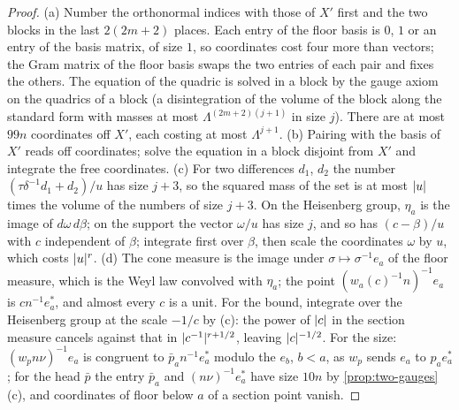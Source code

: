 \begin{proof}
(a) Number the orthonormal indices with those of $X'$ first and the two blocks in the last $2(2m+2)$ places. Each entry of the floor basis is $0$, $1$ or an entry of the basis matrix, of size $1$, so coordinates cost four
more than vectors; the Gram matrix of the floor basis swaps the two entries of each pair and fixes the others. The equation of the quadric is solved in a block by the gauge axiom on the quadrics of a block (a disintegration
of the volume of the block along the standard form with masses at most $\Lambda^{(2m+2)(j+1)}$ in size $j$). There are at most $99n$ coordinates off $X'$, each costing at most $\Lambda^{j+1}$. (b) Pairing with the basis of $X'$ reads
off coordinates; solve the equation in a block disjoint from $X'$ and integrate the free coordinates. (c) For two differences $d_1$, $d_2$ the number $(\tau\delta^{-1}d_1+d_2)/u$ has size $j+3$, so the squared mass of the set is at most $\lvert u\rvert$ times
the volume of the numbers of size $j+3$. On the Heisenberg group, $\eta_a$ is the image of $d\omega\,d\beta$; on the support the vector $\omega/u$ has size $j$, and so has $(c-\beta)/u$ with $c$ independent of $\beta$; integrate first over
$\beta$, then scale the coordinates $\omega$ by $u$, which costs $\lvert u\rvert^r$. (d) The cone measure is the image under $\sigma\mapsto\sigma^{-1}e_a$ of the floor measure, which is the Weyl law convolved with $\eta_a$; the point
$(w_a(c)^{-1}n)^{-1}e_a$ is $cn^{-1}e^*_a$, and almost every $c$ is a unit. For the bound, integrate over the Heisenberg group at the scale $-1/c$ by (c): the power of $\lvert c\rvert$ in the section measure cancels against that in
$\lvert c^{-1}\rvert^{r+1/2}$, leaving $\lvert c\rvert^{-1/2}$. For the size: $(w_pn\nu)^{-1}e_a$ is congruent to $\bar p_an^{-1}e^*_a$ modulo the $e_b$, $b<a$, as $w_p$ sends $e_a$ to $p_ae^*_a$; for the head $\bar p$ the entry $\bar p_a$ and $(n\nu)^{-1}e^*_a$ have size
$10n$ by \cref{prop:two-gauges}(c), and coordinates of floor below $a$ of a section point vanish.
\end{proof}

